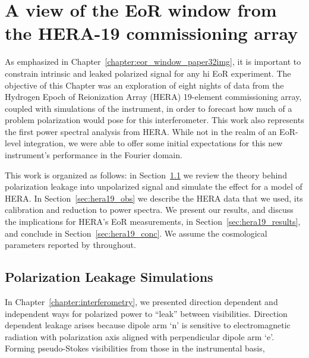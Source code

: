 \chapter{A view of the EoR window from the HERA-19 commissioning array}
\label{chapter:eor_window_HERA}

As emphasized in Chapter~\ref{chapter:eor_window_paper32img}, it is important to constrain intrinsic and leaked polarized signal for any {\sc hi} EoR experiment. 
The objective of this Chapter was an exploration of eight nights of data from the Hydrogen Epoch of Reionization Array (HERA) 19-element commissioning array, coupled with simulations of the instrument, in order to forecast how much of a problem polarization would pose for this interferometer. 
This work also represents the first power spectral analysis from HERA. While not in the realm of an EoR-level integration, we were able to offer some initial expectations for this new instrument's performance in the Fourier domain.

This work is organized as follows: in Section~\ref{sec:hera19_leak} we review the theory behind polarization leakage into unpolarized signal and simulate the effect for a model of HERA. In Section~\ref{sec:hera19_obs} we describe the HERA data that we used, its calibration and reduction to power spectra. We present our results, and discuss the implications for HERA's EoR measurements, in Section~\ref{sec:hera19_results}, and conclude in Section~\ref{sec:hera19_conc}. We assume the cosmological parameters reported by \cite{Planck.16} throughout.

\section{Polarization Leakage Simulations}
\label{sec:hera19_leak}

In Chapter~\ref{chapter:interferometry}, we presented direction dependent and independent ways for polarized power to ``leak'' between visibilities. Direction dependent leakage arises because dipole arm `n' is sensitive to electromagnetic radiation with polarization axis aligned with perpendicular dipole arm `e'. Forming pseudo-Stokes visibilities from those in the instrumental basis,

